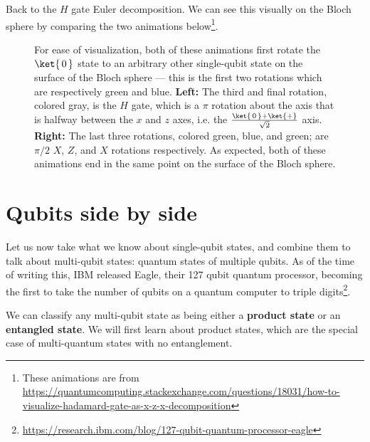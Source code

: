 \documentclass{article}
\theoremstyle{definition}
\newcommand{\kz}[1]{\ket{\,#1\,}}
\newcommand{\kx}[1]{\ket{#1}}
\begin{document}
Back to the $H$ gate Euler decomposition.  We can see this visually on the Bloch sphere by comparing the two animations below\footnote{These animations are from \url{https://quantumcomputing.stackexchange.com/questions/18031/how-to-visualize-hadamard-gate-as-x-z-x-decomposition}}.
\begin{figure}[H]
\noindent%
\begin{minipage}[t]{0.45\linewidth}
	\begin{frame}{}
	\end{frame}\end{minipage}%
\hfill%
\begin{minipage}[t]{0.45\linewidth}
	\begin{frame}{}
	\end{frame}
\end{minipage}
\caption{For ease of visualization, both of these animations first rotate the $\kz0$ state to an arbitrary other single-qubit state on the surface of the Bloch sphere --- this is the first two rotations which are respectively green and blue.  \textbf{Left:} The third and final rotation, colored gray, is the $H$ gate, which is a $\pi$ rotation about the axis that is halfway between the $x$ and $z$ axes, i.e. the $\frac{\kz0 + \kx+}{\sqrt{2}}$ axis.  \textbf{Right:} The last three rotations, colored green, blue, and green; are $\pi/2$ $X$, $Z$, and $X$ rotations respectively.  As expected, both of these animations end in the same point on the surface of the Bloch sphere.}
\end{figure}

\section{Qubits side by side}
Let us now take what we know about single-qubit states, and combine them to talk about multi-qubit states: quantum states of multiple qubits.
As of the time of writing this, IBM released Eagle, their 127 qubit quantum processor, becoming the first to take the number of qubits on a quantum computer to triple digits\footnote{\url{https://research.ibm.com/blog/127-qubit-quantum-processor-eagle}}.

We can classify any multi-qubit state as being either a \textbf{product state} or an \textbf{entangled state}.
We will first learn about product states, which are the special case of multi-quantum states with no entanglement.
\end{document}
